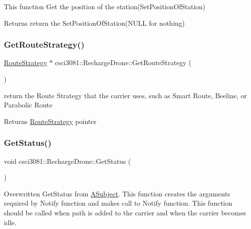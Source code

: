 This function Get the position of the station(\+Set\+Position\+Of\+Station) 

\begin{DoxyReturn}{Returns}
return the Set\+Position\+Of\+Station(\+N\+U\+L\+L for nothing) 
\end{DoxyReturn}
\mbox{\label{classcsci3081_1_1RechargeDrone_a5dacec43761a0e06f063c04f56654346}} 
\subsubsection{\texorpdfstring{Get\+Route\+Strategy()}{GetRouteStrategy()}}
{\footnotesize\ttfamily \hyperlink{classcsci3081_1_1RouteStrategy}{Route\+Strategy} $\ast$ csci3081\+::\+Recharge\+Drone\+::\+Get\+Route\+Strategy (\begin{DoxyParamCaption}{ }\end{DoxyParamCaption})}



return the Route Strategy that the carrier uses, such as Smart Route, Beeline, or Parabolic Route 

\begin{DoxyReturn}{Returns}
\hyperlink{classcsci3081_1_1RouteStrategy}{Route\+Strategy} pointer 
\end{DoxyReturn}
\mbox{\label{classcsci3081_1_1RechargeDrone_aa245b79215b39c86c1f9fde874bdf264}} 
\subsubsection{\texorpdfstring{Get\+Status()}{GetStatus()}}
{\footnotesize\ttfamily void csci3081\+::\+Recharge\+Drone\+::\+Get\+Status (\begin{DoxyParamCaption}{ }\end{DoxyParamCaption})\hspace{0.3cm}{\ttfamily [virtual]}}



Overwritten Get\+Status from \hyperlink{classcsci3081_1_1ASubject}{A\+Subject}. This function creates the arguments required by Notify function and makes call to Notify function. This function should be called when path is added to the carrier and when the carrier becomes idle. 


